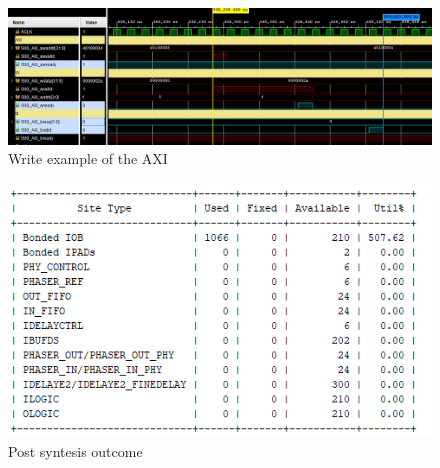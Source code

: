 \begin{figure}[!hb]
  \includegraphics[width=\textwidth]{./../../img/Images/AXI_waveform_write}
  \caption{Write example of the AXI}
  \label{WriteAXI}
\end{figure}

\begin{figure}[!hb]
  \includegraphics[width=\textwidth]{./../../img/Images/Tabella_post_synthesis}
  \caption{Post syntesis outcome}
  \label{PSO}
\end{figure}
